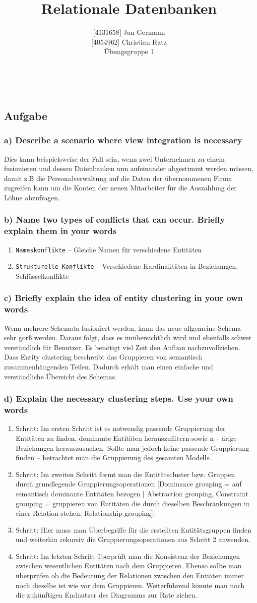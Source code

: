 \documentclass[11pt,a4paper,DIV=9]{scrartcl}
\author{{[}4131658{]} Jan Germann \\{[}4054962{]} Christian Ratz\\Übungsgruppe 1}
\title{Relationale Datenbanken}
\newcounter{temp}
\newcommand{\aufgabe}[1]{
  \setcounter{temp}{\value{subsection}}
  \setcounter{subsection}{#1}
  \addtocounter{subsection}{-1}
  \subsection{Aufgabe}
  \setcounter{subsection}{\value{temp}}
}
\newcommand{\teil}[2][]{
  \subsubsection*{#2) #1}
}
\renewcommand{\author}[1]{\renewcommand{\author}{#1}}
\renewcommand{\title}[1]{\renewcommand{\title}{#1}}
\newcommand{\makehomeworktitle}{
  \begin{minipage}[t]{6.5cm}
    \sf{\author}
  \end{minipage}
  \begin{minipage}[t]{6.5cm}
    \begin{flushright}
      \sf{\title\\\today}
    \end{flushright}
  \end{minipage}
  \\[0.2cm]
  \begin{center}
    \sf{
      \color{blue}{
        \LARGE{Aufgabenblatt \blattnr}
      }
    }
  \end{center}
  \vspace{0.1cm}
}
\begin{document}
\makehomeworktitle

\aufgabe{1}
\teil[Describe a scenario where view integration is necessary]{a}
  Dies kann beispielsweise der Fall sein, wenn zwei Unternehmen zu einem fusionieren und dessen Datenbanken nun aufeinander abgestimmt werden m\"ussen, damit z.B die Personalverwaltung auf die Daten der \"ubernommenen Firma zugreifen kann um die Konten der neuen Mitarbeiter f\"ur die Auszahlung der L\"ohne abzufragen.
\teil[Name two types of conflicts that can occur. Briefly explain them in your words]{b}
  \begin{enumerate}
    \item \texttt{Nameskonflikte} -- Gleiche Namen f\"ur verschiedene Entit\"aten
    \item \texttt{Strukturelle Konflikte} -- Verschiedene Kardinalit\"aten in Beziehungen, Schl\"usselkonflikte
  \end{enumerate}
  
\teil[Briefly explain the idea of entity clustering in your own words]{c}
  Wenn mehrere Schemata fusioniert werden, kann das neue allgemeine Schema sehr gor{\ss} werden. Daraus folgt, dass es un\"ubersichtlich wird und ebenfalls schwer verst\"andlich f\"ur Benutzer. Es ben\"otigt viel Zeit den Aufbau nachzuvollziehen. Dass Entity clustering beschreibt das Gruppieren von semantisch zusammenh\"angenden Teilen. Dadurch erh\"alt man einen einfache und verst\"andliche \"Ubersicht des Schemas.
\teil[Explain the necessary clustering steps. Use your own words]{d}
  \begin{enumerate}
    \item Schritt: Im ersten Schritt ist es notwendig passende Gruppierung der Entit\"aten zu finden, dominante Entit\"aten herauszufiltern sowie n -- \"arige Beziehungen herauszusuchen. Sollte man jedoch keine passende Gruppierung finden -- betrachtet man die Gruppierung des gesamten Modells.
    \item Schritt: Im zweiten Schritt formt man die Entit\"atscluster bzw. Gruppen durch grundlegende Gruppierungsoperationen [Dominance grouping = auf semantisch dominante Entit\"aten bezogen | Abstraction grouping, Constraint grouping = gruppieren von Entit\"aten die durch dieselben Beschr\"ankungen in einer Relation stehen, Relationship grouping].
    \item Schritt: Hier muss man \"Uberbegriffe f\"ur die erstellten Entit\"atsgruppen finden und weiterhin rekursiv die Gruppierungsoperationen aus Schritt 2 anwenden.
    \item Schritt: Im letzten Schritt \"uberpr\"uft man die Konsistenz der Beziehungen zwischen wesentlichen Entit\"aten nach dem Gruppieren. Ebenso sollte man \"uberpr\"ufen ob die Bedeutung der Relationen zwischen den Enti\"aten immer noch dieselbe ist wie vor dem Gruppieren. Weiterf\"uhrend k\"onnte man noch die zuk\"unftigen Endnutzer des Diagramms zur Rate ziehen.
  \end{enumerate}
\end{document}
